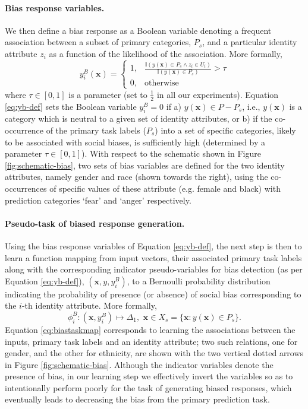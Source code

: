 \documentclass[letterpaper]{article}
\renewcommand{\vec}[1]{\mathbf{#1}}
\begin{document}
\paragraph{Bias response variables.}

We then define a bias response as a Boolean variable denoting a frequent association between a subset of primary categories, $P_s$, and a particular identity attribute $z_i$ as a function of the likelihood of the association. More formally,
\begin{equation}
y^B_i(\vec{x}) =
\begin{cases} 
1, & \frac{\mathbb{I}(y(\vec{x}) \in P_s \land z_i \in U_i)}{\mathbb{I}(y(\vec{x}) \in P_s)} > \tau\\
0, & \mathrm{otherwise}  \label{eq:yb-def}
\end{cases}
\end{equation}
where $\tau\in [0,1]$ is a parameter (set to $\frac{1}{2}$ in all our experiments).
Equation \ref{eq:yb-def} sets the Boolean variable $y^B_i=0$ if a) $y(\vec{x}) \in P-P_s$, i.e., $y(\vec{x})$ is a category which is neutral to a given set of identity attributes, or b) if the co-occurrence of the primary task labels ($P_s$) into a set of specific categories, likely to be associated with social biases, is sufficiently high (determined by a parameter $\tau \in [0,1]$).     
With respect to the schematic shown in Figure \ref{fig:schematic-bias}, two sets of bias variables
are defined for the two identity attributes, namely gender and race (shown towards the right), using the co-occurrences of specific values of these attribute (e.g. female and black) with prediction categories `fear' and `anger' respectively. 


\paragraph{Pseudo-task of biased response generation.}
Using the bias response variables of Equation \ref{eq:yb-def}, the next step is then to learn a function mapping from input vectors, their associated primary task labels along with the corresponding indicator pseudo-variables for bias detection (as per Equation \ref{eq:yb-def}), $(\vec{x}, y, y^B_i)$, to
a Bernoulli probability distribution indicating the probability of presence (or absence) of social bias corresponding to the $i$-th identity attribute.
More formally,
\begin{equation}
\phi^B_i: (\vec{x}, y^B_i) \mapsto \Delta_{1},\,\, \vec{x} \in X_s = \{\vec{x}: y(\vec{x}) \in P_s\}.  \label{eq:biastaskmap}
\end{equation}
Equation \ref{eq:biastaskmap} corresponds to learning the associations between the inputs, primary task labels and an identity attribute; two such relations, one for gender, and the other for ethnicity, are shown with the two vertical dotted arrows in Figure \ref{fig:schematic-bias}.
Although the indicator variables denote the presence of bias, in our learning step we effectively invert the variables so as to intentionally perform poorly for the task of generating biased responses, which eventually leads to decreasing the bias from the primary prediction task. 
\end{document}
